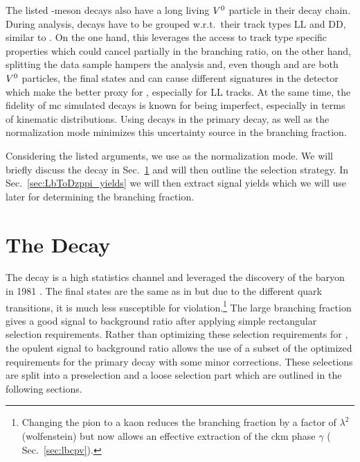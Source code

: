 The listed \bquark-meson decays also have a long living $V^0$ particle in their decay chain.
During analysis, \decay{\KS}{\pip\pim} decays have to be grouped w.r.t.\ their track types \gls{LL} and \gls{DD}, similar to \decay{\Lz}{\proton\pim}.
On the one hand, this leverages the access to track type specific properties which could cancel partially in the branching ratio, on the other hand, splitting the data sample hampers the analysis and, even though \KS and \Lz are both $V^0$ particles, the final states \pip\pim and \proton\pim can cause different signatures in the \lhcb{} detector which make \Dz\proton\pim the better proxy for \Dz\Lz, especially for \gls{LL} tracks.
At the same time, the fidelity of \gls{mc} simulated \Lb decays is known for being imperfect, especially in terms of kinematic distributions.
Using \Lb decays in the primary decay, as well as the normalization mode minimizes this uncertainty source in the branching fraction.

Considering the listed arguments, we use \decay{\Lb}{\Dz\proton\pim} as the normalization mode.
We will briefly discuss the decay in Sec.~\ref{sec:LbToDzppi_thedecay} and will then outline the selection strategy.
In Sec.~\ref{sec:LbToDzppi_yields} we will then extract signal yields which we will use later for determining the branching fraction.

\section{The Decay \texorpdfstring{\decay{\Lb}{\Dz\proton\pim}}{Λb → Dpπ}}
\label{sec:LbToDzppi_thedecay}
The decay \decay{\Lb}{\Dz\proton\pim} is a high statistics channel and leveraged the discovery of the \Lb baryon in 1981 \cite{Lbdisc}.
The final states are the same as in \decay{\Lb}{\Dz\Lz} but due to the different quark transitions, it is much less susceptible for \CP violation.\footnote{Changing the pion to a kaon reduces the branching fraction by a factor of $\lambda^2$ (\gls{wolfenstein}) but now allows an effective extraction of the \gls{ckm} phase $\gamma$ (\cf{} Sec.~\ref{sec:lbcpv}).} 
The large branching fraction gives a good signal to background ratio after applying simple rectangular selection requirements.
Rather than optimizing these selection requirements for \decay{\Lb}{\Dz\proton\pim}, the opulent signal to background ratio allows the use of a subset of the optimized requirements for the primary decay \decay{\Lb}{\Dz\Lz} with some minor corrections. 
These selections are split into a preselection and a loose selection part which are outlined in the following sections.

